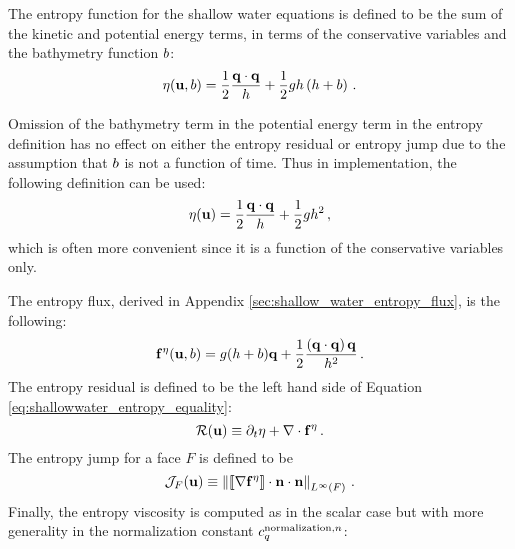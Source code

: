 The entropy function for the shallow water equations is defined to be
the sum of the kinetic and potential energy terms, in terms of the
conservative variables and the bathymetry function $b$:
\begin{equation}
  \eta(\mathbf{u},b)
  = \frac{1}{2}\frac{\mathbf{q}\cdot\mathbf{q}}
  {h} + \frac{1}{2}gh\left(h+b\right)
  \,.
\end{equation}
\begin{remark}
Omission of the bathymetry term in the potential energy
term in the entropy definition has no effect on either the entropy
residual or entropy jump due to the assumption that $b$ is
not a function of time. Thus in implementation, the following definition
can be used:
\begin{equation}
  \eta(\mathbf{u})
  = \frac{1}{2}\frac{\mathbf{q}\cdot\mathbf{q}}
  {h} + \frac{1}{2}gh^2
  \,,
\end{equation}
which is often more convenient since it is a function of the conservative
variables only.
\end{remark}
The entropy flux, derived in Appendix \ref{sec:shallow_water_entropy_flux}, is the
following:
\begin{equation}
  \mathbf{f}^\eta(\mathbf{u},b)
  = g(h + b)\mathbf{q}
  + \frac{1}{2}\frac{\left(\mathbf{q}\cdot\mathbf{q}\right)\mathbf{q}} 
  {h^2}
  \,.
\end{equation}
The entropy residual is defined to be the left hand side of 
Equation \eqref{eq:shallowwater_entropy_equality}:
\begin{equation}
  \mathcal{R}(\mathbf{u}) \equiv \partial_t\eta
  + \nabla\cdot\mathbf{f}^\eta
  \,.
\end{equation}
The entropy jump for a face $F$ is defined to be
\begin{equation}
  \mathcal{J}_F(\mathbf{u})
  \equiv \left\|
    \left\llbracket\nabla\mathbf{f}^\eta\right\rrbracket
    \cdot\mathbf{n}\cdot\mathbf{n}
  \right\|_{L^\infty(F)} \,.
\end{equation}
Finally, the entropy viscosity is computed as in the scalar case but with
more generality in the normalization constant $c^{\text{normalization},n}_q$:
